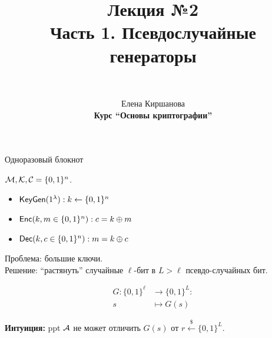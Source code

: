 \documentclass[usenames,dvipsnames,8pt,aspectratio=169]{beamer}
\author{\\ [10pt]
}
\title{Лекция №2 \\[10pt]
		Часть 1. Псевдослучайные генераторы}
\date{ Елена Киршанова \\  \textbf{Курс ``Основы криптографии''} \\  }
\begin{document}
	
\begin{frame}
	\titlepage
\end{frame}

\begin{frame}{Одноразовый блокнот}
\LARGE

$\mathcal{M}, \mathcal{K}, \mathcal{C} = \{0,1\}^n$. \\

\begin{itemize}
	\item $\textsf{KeyGen}(1^{\lambda}): k \leftarrow \{0,1\}^n$ \\[10pt]
	\item $\textsf{Enc}(k, m \in \{0,1\}^n): c = k \oplus m$ \\[10pt]
	\item $\textsf{Dec}(k, c \in \{0,1\}^n): m = k \oplus c$ \\[10pt]
\end{itemize}

{\color{Orange}  Проблема:} большие ключи. \\[10pt]

{\color{Orange}  Решение:}  ``растянуть'' случайные $\ell$-бит в $L > \ell$ {\color{Orange}  псевдо-случайных} бит.

\begin{align*}
	G : \{0,1\}^{\ell} & \rightarrow \{0,1\}^{L}:	\\
		s & \mapsto G(s) 
	\end{align*}
	
{\color{Orange}\textbf{Интуиция:}}  ppt $\mathcal{A}$ не может отличить $G(s)$ от $r \xleftarrow{\$} \{0,1\}^L$.

\end{frame}
\end{document}
